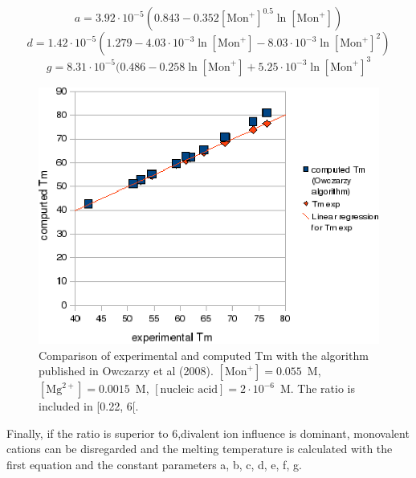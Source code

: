 \documentclass{article}
\begin{document}
\begin{displaymath}
a = 3.92\cdot{}10^{-5} (0.843 - 0.352 [\mbox{Mon}^+]^{0.5} \ln [\mbox{Mon}^+]) 
\end{displaymath}
\begin{displaymath}
d = 1.42\cdot{}10^{-5} (1.279 - 4.03\cdot{}10^{-3} \ln [\mbox{Mon}^+] -
8.03\cdot{}10^{-3} \ln [\mbox{Mon}^+]^{2})
\end{displaymath}
\begin{displaymath}
g = 8.31\cdot{}10^{-5} (0.486 - 0.258 \ln [\mbox{Mon}^+] + 5.25\cdot{}10^{-3}
\ln [\mbox{Mon}^+]^{3} 
\end{displaymath}

\begin{figure}[H]
\includegraphics{Owczarzy3.eps}
\caption{Comparison of experimental and computed Tm with the algorithm published
in Owczarzy et al (2008). $[\mbox{Mon}^+] = 0.055$~M, $[\mbox{Mg}^{2+}] = 0.0015$~M, $[\mbox{nucleic acid}] =
2\cdot{}10^{-6}$~M. The ratio is included in [0.22, 6[.}
\end{figure}

Finally, if the ratio is superior to 6,divalent ion influence is dominant, monovalent cations can be 
disregarded and the melting temperature is calculated with the first equation and the constant parameters a, b, c, d,
e, f, g.
\end{document}
